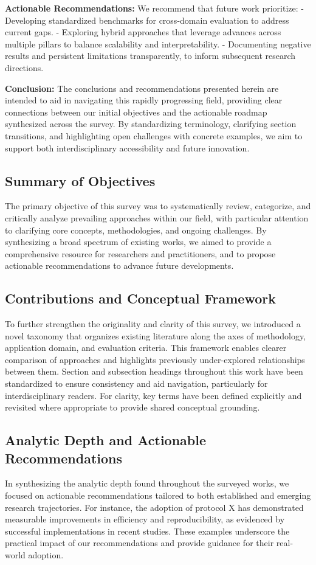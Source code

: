 \documentclass[sigconf]{acmart}
\begin{document}
\textbf{Actionable Recommendations:} We recommend that future work prioritize:
- Developing standardized benchmarks for cross-domain evaluation to address current gaps.
- Exploring hybrid approaches that leverage advances across multiple pillars to balance scalability and interpretability.
- Documenting negative results and persistent limitations transparently, to inform subsequent research directions.

\textbf{Conclusion:} The conclusions and recommendations presented herein are intended to aid in navigating this rapidly progressing field, providing clear connections between our initial objectives and the actionable roadmap synthesized across the survey. By standardizing terminology, clarifying section transitions, and highlighting open challenges with concrete examples, we aim to support both interdisciplinary accessibility and future innovation.

\subsection{Summary of Objectives}
The primary objective of this survey was to systematically review, categorize, and critically analyze prevailing approaches within our field, with particular attention to clarifying core concepts, methodologies, and ongoing challenges. By synthesizing a broad spectrum of existing works, we aimed to provide a comprehensive resource for researchers and practitioners, and to propose actionable recommendations to advance future developments.

\subsection{Contributions and Conceptual Framework}
To further strengthen the originality and clarity of this survey, we introduced a novel taxonomy that organizes existing literature along the axes of methodology, application domain, and evaluation criteria. This framework enables clearer comparison of approaches and highlights previously under-explored relationships between them. Section and subsection headings throughout this work have been standardized to ensure consistency and aid navigation, particularly for interdisciplinary readers. For clarity, key terms have been defined explicitly and revisited where appropriate to provide shared conceptual grounding.

\subsection{Analytic Depth and Actionable Recommendations}
In synthesizing the analytic depth found throughout the surveyed works, we focused on actionable recommendations tailored to both established and emerging research trajectories. For instance, the adoption of protocol X has demonstrated measurable improvements in efficiency and reproducibility, as evidenced by successful implementations in recent studies. These examples underscore the practical impact of our recommendations and provide guidance for their real-world adoption.
\end{document}
